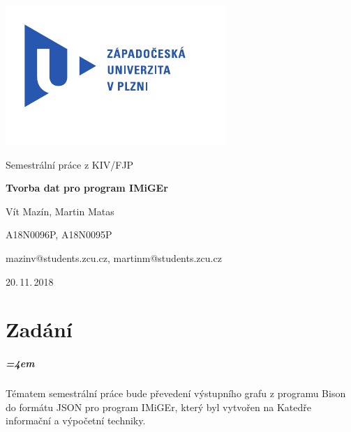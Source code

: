 \documentclass[
12pt,
a4paper,
pdftex,
czech,
titlepage
]{report}
\begin{document}
\begin{titlepage}
	\vspace*{-2cm}
	{\centering\includegraphics[scale=1.0]{logo.pdf}\par}
	\centering
	\vspace*{2cm}
	{\Large Semestrální práce z KIV/FJP\par}
	\vspace{1.5cm}
	{\Huge\bfseries Tvorba dat pro program IMiGEr\par}
	\vspace{2cm}

	{\Large Vít Mazín, Martin Matas\par}
	{\Large A18N0096P, A18N0095P\par}
	{\Large mazinv@students.zcu.cz, martinm@students.zcu.cz\par}

	\vfill

	{\Large 20.\,11.\,2018}
\end{titlepage}

\tableofcontents
\thispagestyle{empty}
\clearpage

\chapter{Zadání}
\setcounter{page}{1}
\paragraph{\parindent=4em}{
Tématem semestrální práce bude převedení výstupního grafu z programu Bison do formátu JSON pro program IMiGEr, který byl vytvořen na Katedře informační a výpočetní techniky.
}
\end{document}
